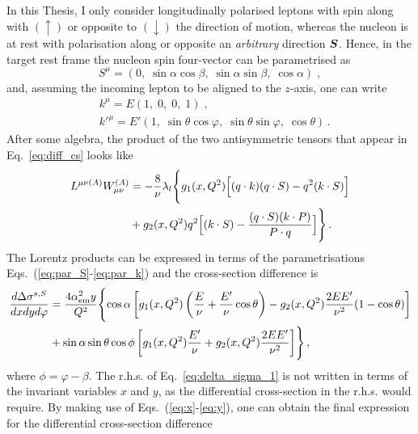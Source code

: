 In this Thesis, I only consider longitudinally polarised leptons with spin along with $(\uparrow)$ or opposite to $(\downarrow)$ the direction of motion, whereas the nucleon is at rest with polarisation along or opposite an \textit{arbitrary} direction $\vb*{S}$. Hence, in the target rest frame the nucleon spin four-vector can be parametrised as
\begin{equation}
  S^{\mu} = (0, \; \sin \alpha \cos\beta, \; \sin \alpha \sin \beta, \; \cos \alpha) \;,
  \label{eq:par_S}
\end{equation}
and, assuming the incoming lepton to be aligned to the $z$-axis, one can write
\begin{equation}
  \begin{split}
    & k^{\mu} = E (1,\; 0,\; 0,\; 1)\;, \\
    & k'^{\mu} = E'( 1,\; \sin\theta \cos \varphi,\; \sin\theta \sin \varphi, \; \cos \theta )\,.
    \label{eq:par_k}
  \end{split}
\end{equation} 
After some algebra, the product of the two antisymmetric tensors that appear in Eq.~\eqref{eq:diff_cs} looks like 
\begin{equation}
  \begin{split}
    L^{\mu \nu (A)} W_{\mu \nu}^{(A)} & = - \frac{8}{\nu} \lambda_{l} \Biggl\{ g_1(x,Q^2) \Bigl[ (q \cdot k)(q \cdot S) - q^2 (k \cdot S) \Bigr] \Biggr. \\
    & +  \Biggl. g_2 (x, Q^2) q^2\Bigl[ (k \cdot S) - \frac{(q \cdot S) (k \cdot P)}{P \cdot q} \Bigr] \Biggr\}\,.
  \end{split}
\end{equation}
The Lorentz products can be expressed in terms of the parametrisations Eqs.~(\ref{eq:par_S}-\ref{eq:par_k}) and the cross-section difference is
\begin{equation}
  \begin{split}
    \frac{d \Delta \sigma^{s,S}}{dx dy d\varphi} & = \frac{4 \alpha_{\textrm{em}}^2 y}{Q^2} \Biggl\{ \cos \alpha \left[ g_1(x,Q^2) \left( \frac{E}{\nu} + \frac{E'}{\nu} \cos \theta \right) - g_2(x,Q^2) \frac{2 E E'}{\nu^2} (1 - \cos \theta) \right] \Biggr. \\
    & + \Biggl. \sin\alpha \sin\theta \cos\phi \left[ g_1(x,Q^2) \frac{E'}{\nu} + g_2(x,Q^2) \frac{2EE'}{\nu^2} \right] \Biggr\}\,,
  \end{split}
  \label{eq:delta_sigma_1}
\end{equation}
where $\phi = \varphi - \beta$. The r.h.s. of Eq.~\eqref{eq:delta_sigma_1} is not written in terms of the invariant variables $x$ and $y$, as the differential cross-section in the r.h.s. would require. By making use of Eqs.~(\ref{eq:x}-\ref{eq:y}), one can obtain the final expression for the differential cross-section difference
